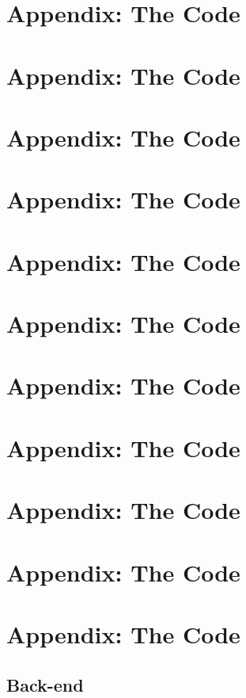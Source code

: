 \documentclass{article}
\begin{document}
\section{Appendix: The Code}
\newpage
\section{Appendix: The Code}
\newpage
\section{Appendix: The Code}
\newpage
\section{Appendix: The Code}
\newpage
\section{Appendix: The Code}
\newpage
\section{Appendix: The Code}
\newpage
\section{Appendix: The Code}
\newpage
\section{Appendix: The Code}
\newpage
\section{Appendix: The Code}
\newpage
\section{Appendix: The Code}
\newpage



\appendix
\section{Appendix: The Code}
\subsection{Back-end}
\end{document}

